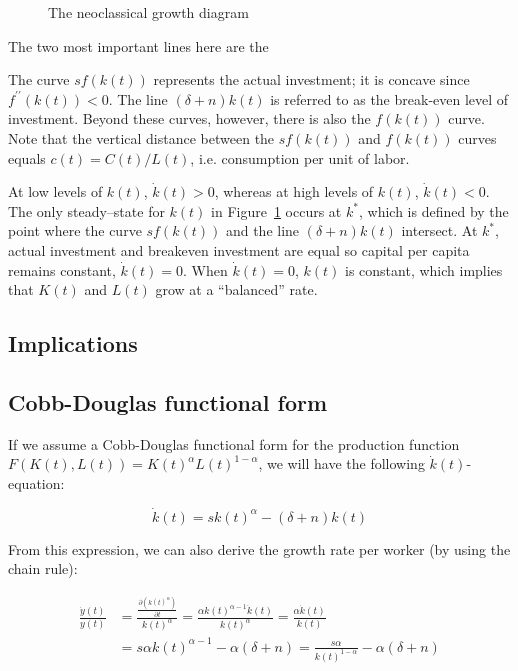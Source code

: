 \documentclass[\topdir/lecture\_notes.tex]{subfiles}
\begin{document}
\begin{figure}[h]
\begin{center}
 \caption{The neoclassical growth diagram}
 \label{fig:solow-neoclassical-growth}
\end{center}
\end{figure}

The two most important lines here are the

The curve $s f(k(t))$ represents the actual investment; it is concave since $f^{\prime \prime}(k(t))<0$.
The line $(\delta+n) k(t)$ is referred to as the break-even level of investment.
Beyond these curves, however, there is also the $f(k(t))$ curve.
Note that the vertical distance between the $s f(k(t))$ and $f(k(t))$ curves equals $c(t)=C(t) / L(t)$, i.e. consumption per unit of labor.

At low levels of $k(t)$, $\dot{k}(t)>0$, whereas at high levels of $k(t)$, $\dot{k}(t)<0$.
The only steady--state for $k(t)$ in Figure~\ref{fig:solow-neoclassical-growth} occurs at $k^{*}$, which is defined by the point where the curve $s f(k(t))$ and the line $(\delta+n) k(t)$ intersect.
At $k^{*}$, actual investment and breakeven investment are equal so capital per capita remains constant, $\dot{k}(t)=0$.
When $\dot{k}(t)=0$, $k(t)$ is constant, which implies that $K(t)$ and $L(t)$ grow at a ``balanced'' rate.

\subsection{Implications}
\subsection{Cobb-Douglas functional form}
If we assume a Cobb-Douglas functional form for the production function $F(K(t), L(t)) = K(t)^{\alpha} L(t)^{1-\alpha}$, we will have the following $\dot{k}(t)$-equation:

\begin{equation}
  \dot{k}(t)=s k(t)^{\alpha}-(\delta+n) k(t) \label{eq:solow-k-dot-cobb-douglas}
\end{equation}

From this expression, we can also derive the growth rate per worker (by using the chain rule):

\begin{equation}
\begin{aligned}
\frac{\dot{y}(t)}{y(t)} & =\frac{\frac{\partial\left(k(t)^{\alpha}\right)}{\partial t}}{k(t)^{\alpha}}=\frac{\alpha k(t)^{\alpha-1} \dot{k}(t)}{k(t)^{\alpha}}=\frac{\alpha \dot{k}(t)}{k(t)} \\
& =s \alpha k(t)^{\alpha-1}-\alpha(\delta+n)=\frac{s \alpha}{k(t)^{1-\alpha}}-\alpha(\delta+n)
\end{aligned}
\label{eq:solow-growth-rate-per-worker}
\end{equation}
\end{document}

